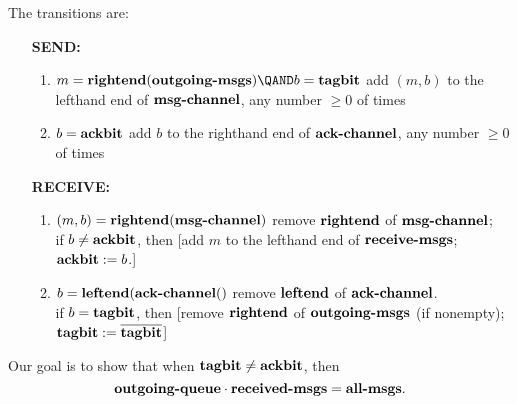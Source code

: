 The transitions are:
\begin{enumerate}
\item[\textbf{SEND:}]

\begin{enumerate}
\item
{}
{%
   $m = \text{\textbf{rightend}}(\text{\textbf{outgoing-msgs}}) \QAND
   b = \text{\textbf{tagbit}}$}
{%
   add $(m,b)$ to the lefthand end of $\text{\textbf{msg-channel}}$,
   any number $\geq 0$ of times}

\item
{}
{%
   $b = \text{\textbf{ackbit}}$}
{%
   add $b$ to the righthand end of $\text{\textbf{ack-channel}}$,
   any number $\geq 0$ of times}
\end{enumerate}

\item[\textbf{RECEIVE:}]

\begin{enumerate}
\item
{}
 {%
   $(m,b) = \text{\textbf{rightend}}(\text{\textbf{msg-channel}})$}
{%
   remove $\text{\textbf{rightend}}$ of $\text{\textbf{msg-channel}}$;\\
   if $b \neq \text{\textbf{ackbit}}$, then
   [add $m$ to the lefthand end of $\text{\textbf{receive-msgs}}$;
   $\text{\textbf{ackbit}} := b$.]}

\item {}
{%
   $b = \text{\textbf{leftend}}(\text{\textbf{ack-channel}}()$}
{%
   remove $\text{\textbf{leftend}}$ of $\text{\textbf{ack-channel}}$.\\
   if $b = \text{\textbf{tagbit}}$, then
   [remove $\text{\textbf{rightend}}$ of $\text{\textbf{outgoing-msgs}}$ (if nonempty);
   $\text{\textbf{tagbit}} := \overline{\text{\textbf{tagbit}}}$]}
\end{enumerate}

\end{enumerate}

Our goal is to show that when $\text{\textbf{tagbit}} \neq
\text{\textbf{ackbit}}$, then\\
\begin{equation}\label{all-msgs-preserved}
\text{\textbf{outgoing-queue}}\cdot \text{\textbf{received-msgs}} =
\text{\textbf{all-msgs}}.
\end{equation}

